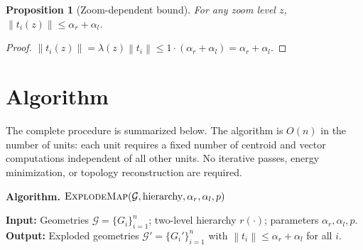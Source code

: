 \documentclass[12pt, a4paper]{article}
\numberwithin{equation}{section}
\theoremstyle{definition}
\theoremstyle{plain}
\newtheorem{proposition}{Proposition}[section]
\theoremstyle{remark}
\newcommand{\norm}[1]{\left\|#1\right\|}
\begin{document}
\begin{proposition}[Zoom-dependent bound]
\label{prop:zoom_bound}
For any zoom level $z$, $\norm{t_i(z)} \leq \alpha_r + \alpha_l$.
\end{proposition}

\begin{proof}
$\norm{t_i(z)} = \lambda(z)\norm{t_i} \leq 1 \cdot (\alpha_r + \alpha_l) = \alpha_r + \alpha_l$.
\end{proof}


\section{Algorithm}
\label{sec:algorithm}

The complete procedure is summarized below. The algorithm is $O(n)$ in the number of units: each unit requires a fixed number of centroid and vector computations independent of all other units. No iterative passes, energy minimization, or topology reconstruction are required.

\bigskip
\noindent\textbf{Algorithm.} $\textsc{ExplodeMap}(\mathcal{G}, \text{hierarchy}, \alpha_r, \alpha_l, p)$

\medskip
\noindent\textbf{Input:} Geometries $\mathcal{G} = \{G_i\}_{i=1}^n$; two-level hierarchy $r(\cdot)$; parameters $\alpha_r, \alpha_l, p$.\\
\textbf{Output:} Exploded geometries $\mathcal{G}' = \{G_i'\}_{i=1}^n$ with $\norm{t_i} \leq \alpha_r + \alpha_l$ for all $i$.
\end{document}
